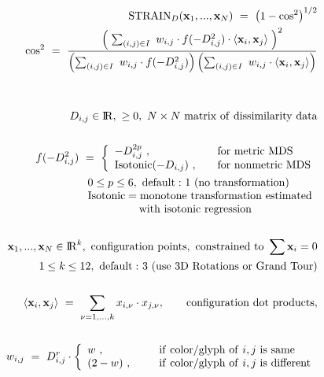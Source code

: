 \documentclass[11pt]{article}
\newcommand{\Reals}   {{\rm I \! R}}
\newcommand{\vx}      {{\mbox{\bf x}}}
\begin{document}
\begin{eqnarray*}
&& {\rm STRAIN}_D(\vx_1,...,\vx_N) ~=~ \left( 1 - \cos^2 \right)^{1/2}
\\
&& ~~~~~~~~ 
\cos^2 ~=~ 
    \frac{ 
      \left( \; 
        \sum_{ (i,j) \in I } ~
          w_{i,j} \cdot f(-D_{i,j}^2) \cdot {\langle \vx_i , \vx_j \rangle}
      \; \right)^2
    }{
      \left( \sum_{ (i,j) \in I } ~w_{i,j} \cdot f(-D_{i,j}^2) \right) 
      \left( \sum_{ (i,j) \in I } ~w_{i,j} \cdot {\langle \vx_i , \vx_j \rangle} \right)
    }
\\
~
\\
~
\\
&& D_{i,j} \in \Reals,~ \ge 0, ~ N \times N ~ {\rm matrix~of~dissimilarity~data}
\\
~
\\
&& f(-D_{i,j}^2) ~=~ \left\{ \begin{array}{ll}
                  -D_{i,j}^{2p}~,               ~~~& {\rm for~metric~MDS}
                  \\
                  {\rm Isotonic}(-D_{i,j})~, ~~~& {\rm for~nonmetric~MDS}
                  \end{array} \right.
\\
&& ~~~~~~~~~~~~~~~
\begin{array}{l}
0 \le p \le 6, ~{\rm default:}~1~({\rm no~transformation}) \\
{\rm Isotonic} = {\rm monotone~transformation~estimated} \\
{\rm ~~~~~~~~~~~~~~ with~isotonic~regression}
\end{array}
\\
~
\\
&& \vx_1,...,\vx_N \in \Reals^k, ~ {\rm configuration~points,~constrained~to} ~\sum \vx_i = 0
\\
&& ~~~~~~~~~~~~~~~~~
1 \le k \le 12, ~{\rm default:}~3~({\rm use~3D~Rotations~or~Grand~Tour})
\\
~
\\
&& {\langle \vx_i , \vx_j \rangle} ~=~ 
   \sum_{\nu=1,...,k}  x_{i,\nu} \cdot x_{j,\nu} ,
~~~~~~
{\rm configuration~dot~products,}
\\
~
\\
&& 
w_{i,j} ~=~ D_{i,j}^r \cdot \left\{ \begin{array}{ll}
                            w     ~, ~~~~~& {\rm if~color/glyph~of}~i,j~{\rm is~same}      \\
                            (2-w) ~, ~~~~~& {\rm if~color/glyph~of}~i,j~{\rm is~different}
			    \end{array} \right. 

\end{eqnarray*}
\end{document}
